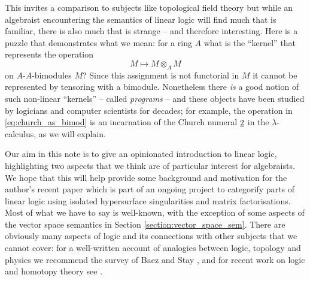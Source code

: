 \documentclass[english,letter paper,12pt,reqno]{article}
\theoremstyle{example}
\numberwithin{equation}{section}
\begin{document}
This invites a comparison to subjects like topological field theory \cite{atiyah,witten} but while an algebraist encountering the semantics of linear logic will find much that is familiar, there is also much that is strange -- and therefore interesting. Here is a puzzle that demonstrates what we mean: for a ring $A$ what is the ``kernel'' that represents the operation
\begin{equation}\label{eq:church_as_bimod}
M \longmapsto M \otimes_A M
\end{equation}
on $A$-$A$-bimodules $M$? Since this assignment is not functorial in $M$ it cannot be represented by tensoring with a bimodule. Nonetheless there \emph{is} a good notion of such non-linear ``kernels'' -- called \emph{programs} -- and these objects have been studied by logicians and computer scientists for decades; for example, the operation in \eqref{eq:church_as_bimod} is an incarnation of the Church numeral $\underline{2}$ in the $\lambda$-calculus, as we will explain.

Our aim in this note is to give an opinionated introduction to linear logic, highlighting two aspects that we think are of particular interest for algebraists. We hope that this will help provide some background and motivation for the author's recent paper \cite{murfet} which is part of an ongoing project to categorify parts of linear logic using isolated hypersurface singularities and matrix factorisations. Most of what we have to say is well-known, with the exception of some aspects of the vector space semantics in Section \ref{section:vector_space_sem}. There are obviously many aspects of logic and its connections with other subjects that we cannot cover: for a well-written account of analogies between logic, topology and physics we recommend the survey of Baez and Stay \cite{baez}, and for recent work on logic and homotopy theory see \cite{univalent}.
\\
\end{document}
